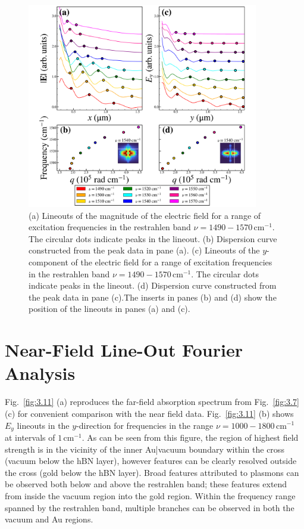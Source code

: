 \documentclass[preprint,
amsmath,amssymb,
aip,
jap,
floatfix,]{revtex4-2}
\begin{document}
				\begin{figure}[!htb]
				  \includegraphics[width=0.9\textwidth]{Figures/Fig5.pdf} 
				  \caption{(a) Lineouts of the magnitude of the electric field for a range of excitation frequencies in the restrahlen band $\nu = 1490 - 1570\, \mathrm{cm}^{-1}$. The circular dots indicate peaks in the lineout. (b) Dispersion curve constructed from the peak data in pane (a). (c) Lineouts of the $y$-component of the electric field for a range of excitation frequencies in the restrahlen band $\nu = 1490 - 1570\, \mathrm{cm}^{-1}$. The circular dots indicate peaks in the lineout. (d) Dispersion curve constructed from the peak data in pane (c).The inserts in panes (b) and (d) show the position of the lineouts in panes (a) and (c).
				  }
				  \label{fig:3.10}
				\end{figure}	

		\section{Near-Field Line-Out Fourier Analysis}
		\label{sec:NFFA}

				Fig.~\ref{fig:3.11} (a) reproduces the far-field absorption spectrum from Fig.~\ref{fig:3.7} (c)  for convenient comparison with the near field data. Fig.~\ref{fig:3.11} (b) shows $E_y$ lineouts in the $y$-direction for frequencies in the range $\nu = 1000 - 1800\, \mathrm{cm}^{-1}$ at intervals of $1\, \mathrm{cm}^{-1}$. As can be seen from this figure, the region of highest field strength is in the vicinity of the inner Au|vacuum boundary within the cross (vacuum below the hBN layer), however features can be clearly resolved outside the cross (gold below the hBN layer). Broad features attributed to plasmons can be observed both below and above the restrahlen band; these features extend from inside the vacuum region into the gold region. Within the frequency range spanned by the restrahlen band, multiple branches can be observed in both the vacuum and Au regions. 
\end{document}

